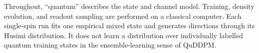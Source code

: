 Throughout, ``quantum'' describes the state and channel model. Training, density evolution, and readout sampling are performed on a classical computer. Each single-spin run fits one empirical mixed state and generates directions through its Husimi distribution. It does not learn a distribution over individually labelled quantum training states in the ensemble-learning sense of QuDDPM.
